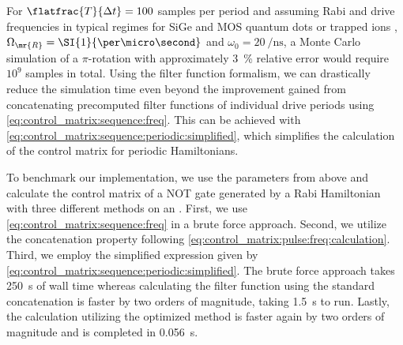 For $\flatfrac{T}{\Delta t} = 100$ samples per period and assuming Rabi and drive frequencies in typical regimes for SiGe and MOS quantum dots \cite{Zajac2018,Pla2012} or trapped ions \cite{Soare2014}, $\Omega_\mr{R} = \SI{1}{\per\micro\second}$ and $\omega_0 = \SI{20}{\per\nano\second}$, a Monte Carlo simulation of a $\pi$-rotation with approximately \SI{3}{\percent} relative error would require $10^9$ samples in total. Using the filter function formalism, we can drastically reduce the simulation time even beyond the improvement gained from concatenating precomputed filter functions of individual drive periods using \cref{eq:control_matrix:sequence:freq}. This can be achieved with \cref{eq:control_matrix:sequence:periodic:simplified}, which simplifies the calculation of the control matrix for periodic Hamiltonians.

To benchmark our implementation, we use the parameters from above and calculate the control matrix of a NOT gate generated by a Rabi Hamiltonian with three different methods on an \fastprocessor. First, we use \cref{eq:control_matrix:sequence:freq} in a brute force approach. Second, we utilize the concatenation property following \cref{eq:control_matrix:pulse:freq:calculation}. Third, we employ the simplified expression given by \cref{eq:control_matrix:sequence:periodic:simplified}. The brute force approach takes \SI{250}{\second} of wall time whereas calculating the filter function using the standard concatenation is faster by two orders of magnitude, taking \SI{1.5}{\second} to run. Lastly, the calculation utilizing the optimized method is faster again by two orders of magnitude and is completed in \SI{0.056}{\second}.


